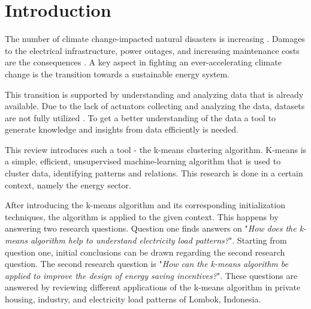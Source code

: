 \section{Introduction}
\label{cha:introduction}


The number of climate change-impacted natural disasters is increasing \cite{JES-IND}.
Damages to the electrical infrastructure, power outages, and increasing maintenance costs are the consequences \cite{FAN-CCI}.
A key aspect in fighting an ever-accelerating climate change is the transition towards a sustainable energy system.

This transition is supported by understanding and analyzing data that is already available.
Due to the lack of actuators collecting and analyzing the data, datasets are not fully utilized \cite{LIU-BDE}.
To get a better understanding of the data a tool to generate knowledge and insights from data efficiently is needed.

This review introduces such a tool - the k-means clustering algorithm.
K-means is a simple, efficient, unsupervised machine-learning algorithm that is used to cluster data, identifying patterns and relations.
This research is done in a certain context, namely the energy sector.

After introducing the k-means algorithm and its corresponding initialization techniques, the algorithm is applied to the given context.
This happens by answering two research questions.
Question one finds answers on "\textit{How does the k-means algorithm help to understand electricity load patterns?}".
Starting from question one, initial conclusions can be drawn regarding the second research question.
The second research question is "\textit{How can the k-means algorithm be applied to improve the design of energy saving incentives?}".
These questions are answered by reviewing different applications of the k-means algorithm in private housing, industry, and electricity load patterns of Lombok, Indonesia.

